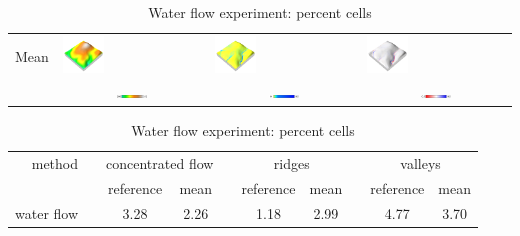 \documentclass[Afour,sageh,times]{sagej}
\newcommand{\ra}[1]{\renewcommand{\arraystretch}{#1}}
\begin{document}
\begin{table}[h]
\begin{tabular}{m{} m{} m{} m{}}
%
Mean & 
\includegraphics[width=0.3\textwidth]{images/render_3d/participants/mean_dem_5.png} &
\includegraphics[width=0.3\textwidth]{images/render_3d/participants/mean_depth_5.png} &
\includegraphics[width=0.3\textwidth]{images/render_3d/participants/mean_depth_difference_5.png}\\
%
& 
\multicolumn{1}{c}{\includegraphics[width=0.22\textwidth]{images/legends/elevation_legend_5.pdf}} &
\multicolumn{1}{c}{\includegraphics[width=0.22\textwidth]{images/legends/depth_legend.pdf}} &
\multicolumn{1}{c}{\includegraphics[width=0.22\textwidth]{images/legends/depth_diff_legend.pdf}}\\
%
\bottomrule
\end{tabular}
\label{table:water_flow_experiment} 
%
\vspace*{1.5em}
%
\caption{Water flow experiment: percent cells}
\ra{1.3}
\begin{tabular}{rrcccccccc}\toprule
method && \multicolumn{2}{c}{concentrated flow} & \phantom{abc}& \multicolumn{2}{c}{ridges} &
\phantom{abc} & \multicolumn{2}{c}{valleys}\\
\cmidrule{3-4} \cmidrule{6-7} \cmidrule{9-10}
&& reference & mean && reference & mean && reference & mean\\ \midrule
water flow && 3.28 & 2.26 && 1.18 & 2.99 && 4.77 & 3.70\\
\bottomrule
\end{tabular}
\label{table:water_flow_percent_cells} 
\end{table}
\end{document}
